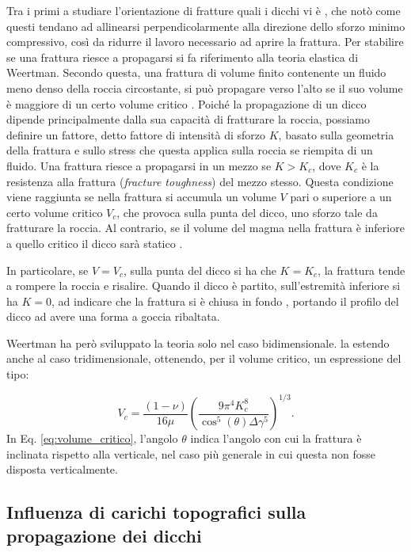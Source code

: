 Tra i primi a studiare l'orientazione di fratture quali i dicchi vi è \citet{anderson1951dynamics}, che notò come questi tendano ad allinearsi perpendicolarmente alla direzione dello sforzo minimo compressivo, così da ridurre il lavoro necessario ad aprire la frattura.
Per stabilire se una frattura riesce a propagarsi si fa riferimento alla teoria elastica di Weertman. Secondo questa, una frattura di volume finito contenente un fluido meno denso della roccia circostante, si può propagare verso l'alto se il suo volume è maggiore di un certo volume critico \citep{Rivalta2015,Dahm2000,Davis2020}.
Poiché la propagazione di un dicco dipende principalmente dalla sua capacità di fratturare la roccia, possiamo definire un fattore, detto fattore di intensità di sforzo \(K\), basato sulla geometria della frattura e sullo stress che questa applica sulla roccia se riempita di un fluido. Una frattura riesce a propagarsi in un mezzo se \(K > K_c\), dove \(K_c\) è la resistenza alla frattura (\textit{fracture toughness}) del mezzo stesso.  
Questa condizione viene raggiunta se nella frattura si accumula un volume \(V\) pari o superiore a un certo volume critico \(V_c\), che provoca sulla punta del dicco, uno sforzo tale da fratturare la roccia.
Al contrario, se il volume del magma nella frattura è inferiore a quello critico il dicco sarà statico \citep{Rivalta2015}.

In particolare, se \(V=V_c\), sulla punta del dicco si ha che \(K=K_c\), la frattura tende a rompere la roccia e risalire. Quando il dicco è partito, sull'estremità inferiore si ha \(K=0\), ad indicare che la frattura si è chiusa in fondo \citep{Rivalta2015}, portando il profilo del dicco ad avere una forma a goccia ribaltata.

Weertman ha però sviluppato la teoria solo nel caso bidimensionale. \citet{Davis2020} la estendo anche al caso tridimensionale, ottenendo, per il volume critico, un espressione del tipo:

\begin{equation}
    \label{eq:volume_critico}
    V_c = \frac{(1-\nu)}{16\mu} \left( \frac{9 \pi^4 K_c^8}{\cos^5(\theta)\Delta\gamma^5} \right)^{1/3}.
\end{equation}
In Eq. \eqref{eq:volume_critico}, l'angolo \(\theta\) indica l'angolo con cui la frattura è inclinata rispetto alla verticale, nel caso più generale in cui questa non fosse disposta verticalmente.


\subsection{Influenza di carichi topografici sulla propagazione dei dicchi}

